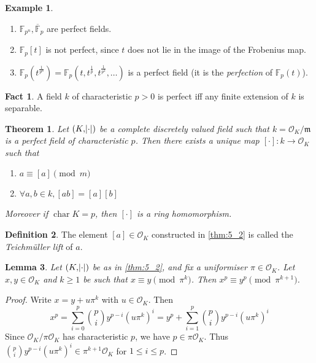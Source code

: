 \documentclass[11pt]{article}
\theoremstyle{definition}
\newtheorem{definition}{Definition}[subsection]
\newtheorem*{example}{Example}
\newtheorem*{fact}{Fact}
\theoremstyle{plain}
\newtheorem{theorem}[definition]{Theorem}
\newtheorem{lemma}[definition]{Lemma}
\theoremstyle{remark}
\DeclareMathOperator{\Char}{char}
\newcommand{\bF}{\mathbb{F}}
\newcommand{\cO}{\mathcal{O}}
\newcommand{\fm}{\mathfrak{m}}
\begin{document}
\begin{example}\phantom{}
    \begin{enumerate}
        \item $\bF_{p^n}, \overline{\bF}_p$ are perfect fields.
        \item $\bF_p[t]$ is not perfect, since $t$ does not lie in the image of the Frobenius map.
        \item $\bF_p(t^\frac{1}{p^n}) = \bF_p(t, t^\frac{1}{p}, t^\frac{1}{p^2}, \ldots)$ is a perfect field (it is the \emph{perfection} of $\bF_p(t)$).
    \end{enumerate}
\end{example}

\begin{fact}
    A field $k$ of characteristic $p > 0$ is perfect iff any finite extension of $k$ is separable.
\end{fact}

\begin{theorem}\label{thm:5_2}
    Let $(K, \abs{\cdot})$ be a complete discretely valued field such that $k = \cO_K / \fm$ is a perfect field of characteristic $p$. Then there exists a unique map $[\cdot] : k \to \cO_K$ such that
    \begin{enumerate}
        \item $a \equiv [a] \pmod{m}$
        \item $\forall a, b \in k, [a b] = [a] [b]$
    \end{enumerate}
    Moreover if $\Char K = p$, then $[\cdot]$ is a ring homomorphism.
\end{theorem}

\begin{definition}
    The element $[a] \in \cO_K$ constructed in \autoref{thm:5_2} is called the \emph{Teichm\"uller lift} of $a$.
\end{definition}

\begin{lemma}\label{lem:5_4}
    Let $(K, \abs{\cdot})$ be as in \autoref{thm:5_2}, and fix a uniformiser $\pi \in \cO_K$. Let $x, y \in \cO_K$ and $k \ge 1$ be such that $x \equiv y \pmod{\pi^k}$. Then $x^p \equiv y^p \pmod{\pi^{k+1}}$.
\end{lemma}
\begin{proof}
    Write $x = y + u \pi^k$ with $u \in \cO_K$. Then
    \begin{equation*}
        x^p
        = \sum_{i=0}^p \binom{p}{i} y^{p-i} (u \pi^k)^i
        = y^p + \sum_{i=1}^p \binom{p}{i} y^{p-i} (u \pi^k)^i
    \end{equation*}
    Since $\cO_K / \pi \cO_K$ has characteristic $p$, we have $p \in \pi \cO_K$. Thus $\binom{p}{i} y^{p-i} (u \pi^k)^i \in \pi^{k+1} \cO_K$ for $1 \le i \le p$.
\end{proof}
\end{document}
